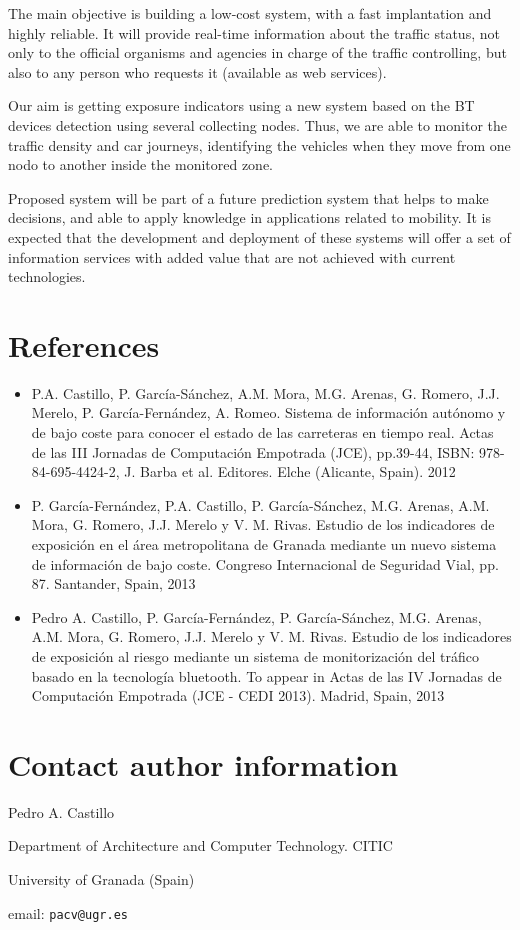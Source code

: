 \documentclass{llncs}
\begin{document}
The main objective is building a low-cost system, with a fast implantation and highly reliable. 
It will provide real-time information about the traffic status, not only to the official organisms and agencies in charge of the traffic controlling, but also to any person who requests it (available as web services).

Our aim is getting exposure indicators using a new system based on the BT devices detection using several collecting nodes. Thus, we are able to monitor the traffic density and car journeys, identifying the vehicles when they move from one nodo to another inside the monitored zone.

Proposed system will be part of a future prediction system that helps to make decisions, and able to apply knowledge in applications related to mobility. It is expected that the development and deployment of these systems will offer a set of information services with added value that are not achieved with current technologies.



\section{References}

\begin{itemize}

 \item P.A. Castillo, P. García-Sánchez, A.M. Mora, M.G. Arenas, G. Romero, J.J. Merelo, P. García-Fernández, A. Romeo. Sistema de información autónomo y de bajo coste para conocer el estado de las carreteras en tiempo real. Actas de las III Jornadas de Computación Empotrada (JCE), pp.39-44, ISBN: 978-84-695-4424-2, J. Barba et al. Editores. Elche (Alicante, Spain). 2012
 
 \item P. García-Fernández, P.A. Castillo, P. García-Sánchez, M.G. Arenas, A.M. Mora, G. Romero, J.J. Merelo y V. M. Rivas. Estudio de los indicadores de exposición en el área metropolitana de Granada mediante un nuevo sistema de información de bajo coste. Congreso Internacional de Seguridad Vial, pp. 87. Santander, Spain, 2013

 \item Pedro A. Castillo, P. García-Fernández, P. García-Sánchez, M.G. Arenas, A.M. Mora, G. Romero, J.J. Merelo y V. M. Rivas. Estudio de los indicadores de exposición al riesgo mediante un sistema de monitorización del tráfico basado en la tecnología bluetooth. To appear in Actas de las IV Jornadas de Computación Empotrada (JCE - CEDI 2013). Madrid, Spain, 2013

\end{itemize}

\section{Contact author information}

Pedro A. Castillo

Department of Architecture and Computer Technology. CITIC

University of Granada (Spain)

email: {\tt pacv@ugr.es}
\end{document}
